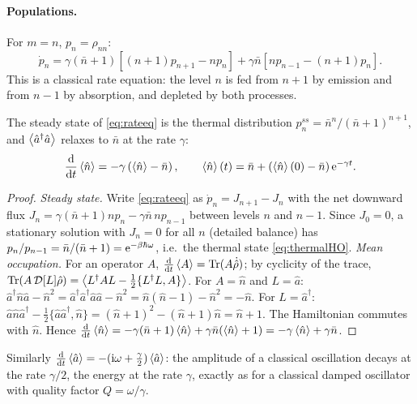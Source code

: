 \paragraph{Populations.} For $m=n$, $p_n=\rho_{nn}$:
\begin{equation}\label{eq:rateeq}
  \dot p_n=\gamma(\bar n+1)\left[(n+1)p_{n+1}-np_n\right]+\gamma\bar n\left[np_{n-1}-(n+1)p_n\right].
\end{equation}
This is a classical rate equation: the level $n$ is fed from $n+1$ by emission and from $n-1$ by absorption, and depleted by both processes.
\begin{proposition}
The steady state of \cref{eq:rateeq} is the thermal distribution $p_n^{ss}=\bar n^n/(\bar n+1)^{n+1}$, and $\left\langle\hat a^\dagger\hat a\right\rangle$ relaxes to $\bar n$ at the rate $\gamma$:
\begin{equation}
  \frac{\mathrm d}{\mathrm d t}\left\langle\hat n\right\rangle=-\gamma\left(\left\langle\hat n\right\rangle-\bar n\right),\qquad\left\langle\hat n\right\rangle(t)=\bar n+\left(\left\langle\hat n\right\rangle(0)-\bar n\right)\mathrm e^{-\gamma t}.
\end{equation}
\end{proposition}
\begin{proof}
\emph{Steady state.} Write \cref{eq:rateeq} as $\dot p_n=J_{n+1}-J_n$ with the net downward flux $J_n=\gamma(\bar n+1)np_n-\gamma\bar n\,np_{n-1}$ between levels $n$ and $n-1$.
Since $J_0=0$, a stationary solution with $J_n=0$ for all $n$ (detailed balance) has $p_n/p_{n-1}=\bar n/(\bar n+1)=\mathrm e^{-\beta\hbar\omega}$, i.e.\ the thermal state \cref{eq:thermalHO}.
\emph{Mean occupation.} For an operator $A$, $\frac{\mathrm d}{\mathrm d t}\left\langle A\right\rangle=\operatorname{Tr}(A\dot{\hat\rho})$; by cyclicity of the trace,
$\operatorname{Tr}(A\,\mathcal D[L]\hat\rho)=\left\langle L^\dagger AL-\frac12\{L^\dagger L,A\}\right\rangle$. For $A=\hat n$ and $L=\hat a$: $\hat a^\dagger\hat n\hat a-\hat n^2=\hat a^\dagger\hat a^\dagger\hat a\hat a-\hat n^2=\hat n(\hat n-1)-\hat n^2=-\hat n$.
For $L=\hat a^\dagger$: $\hat a\hat n\hat a^\dagger-\frac12\{\hat a\hat a^\dagger,\hat n\}=(\hat n+1)^2-(\hat n+1)\hat n=\hat n+1$. The Hamiltonian commutes with $\hat n$. Hence
$\frac{\mathrm d}{\mathrm d t}\left\langle\hat n\right\rangle=-\gamma(\bar n+1)\left\langle\hat n\right\rangle+\gamma\bar n(\left\langle\hat n\right\rangle+1)=-\gamma\left\langle\hat n\right\rangle+\gamma\bar n$.
\end{proof}
Similarly $\frac{\mathrm d}{\mathrm d t}\left\langle\hat a\right\rangle=-(\mathrm i\omega+\frac\gamma2)\left\langle\hat a\right\rangle$: the amplitude of a classical oscillation decays at the rate $\gamma/2$, the energy at the rate $\gamma$,
exactly as for a classical damped oscillator with quality factor $Q=\omega/\gamma$.

